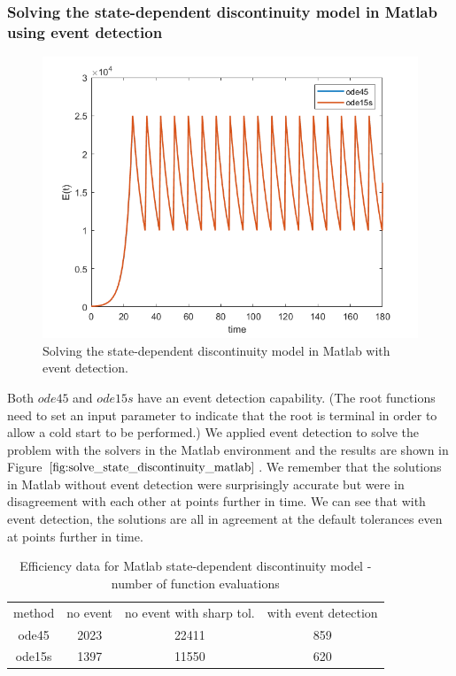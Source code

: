 \subsubsection{Solving the state-dependent discontinuity model in Matlab using event detection}
\begin{figure}[H]
\centering
\includegraphics[width=0.7\linewidth]{./figures/solve_state_discontinuity_matlab}
\caption{Solving the state-dependent discontinuity model in Matlab with event detection.}
\label{fig:solve_state_discontinuity_matlab}
\end{figure}
Both $ode45$ and $ode15s$ have an event detection capability. (The root functions need to set an input parameter to indicate that the root is terminal in order to allow a cold start to be performed.) We applied event detection to solve the problem with the solvers in the Matlab environment and the results are shown in Figure $\ref{fig:solve_state_discontinuity_matlab}$. We remember that the solutions in Matlab without event detection were surprisingly accurate but were in disagreement with each other at points further in time. We can see that with event detection, the solutions are all in agreement at the default tolerances even at points further in time. %

\begin{table}[h]
\caption {Efficiency data for Matlab state-dependent discontinuity model - number of function evaluations} \label{tab:state_discontinuity_matlab}
\begin{center}
\begin{tabular}{ c c c c } 
method & no event & no event with sharp tol. & with event detection \\ 
ode45 & 2023 & 22411 & 859 \\
ode15s & 1397 & 11550 & 620 \\
\end{tabular}
\end{center}
\end{table}

